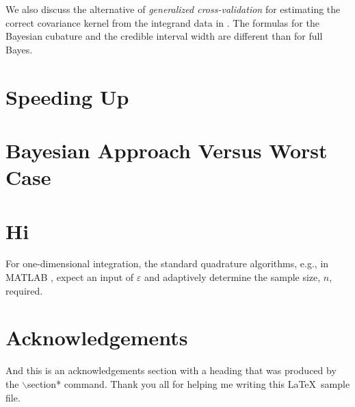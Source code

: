 \documentclass[sts]{imsart}
\numberwithin{equation}{section}
\theoremstyle{plain}
\begin{document}
We also discuss the alternative of \emph{generalized cross-validation} for estimating the correct covariance kernel from the integrand data in \cite{RatHic19a}.  The formulas for the Bayesian cubature and the credible interval width are different than for full Bayes.



\section{Speeding Up} \label{sec:Match}

\section{Bayesian Approach Versus Worst Case}


\section{Hi}


For one-dimensional integration, the standard quadrature algorithms, e.g., in MATLAB \citep{MAT9.5}, expect an input of $\varepsilon$ and adaptively determine the sample size, $n$, required.




\section*{Acknowledgements}
And this is an acknowledgements section with a heading that was produced by the
$\backslash$section* command. Thank you all for helping me writing this
\LaTeX\ sample file.



\end{document}
